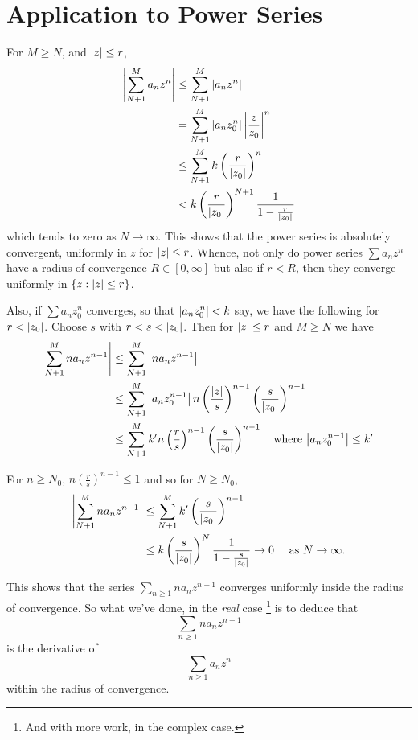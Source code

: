 \documentclass{notes}
\theoremstyle{plain}
\begin{document}
\section{Application to Power Series}
For $ M \geq N $, and $ \left|z\right| \leq r $,
\begin{align*}
\left|\sum_{N+1}^{M} a_n z^n \right| & \leq \sum_{N+1}^{M} \left|a_{n}z^{n}\right| \\
& = \sum_{N+1}^{M}\left|a_{n}z_{0}^{n}\right|\left|\frac{z}{z_{0}}\right|^{n} \\
& \leq \sum_{N+1}^{M} k \left( \frac{r}{\left|z_{0}\right|} \right)^{n} \\
& < k \left( \frac{r}{\left|z_{0}\right|}
\right)^{N+1}\frac{1}{1-\frac{r}{\left|z_{0}\right|}}
\end{align*}
which tends to zero as $  N \to \infty $.
This shows that the power series is absolutely convergent, uniformly 
in $ z $ for $ \left|z\right| \leq r $.
Whence, not only do power series
$\sum a_{n}z^{n}$ have a radius of convergence $R \in [0, 
\infty]$ but also if $ r < R $, then they converge uniformly in
$\{z : \left|z\right| \leq r \}$.

Also, if $\sum a_{n}z_{0}^{n}$ converges, so that  
$\left|a_{n}z_{0}^{n}\right| < k$ say, we have the following for $ r < 
\left|z_{0}\right| $.
Choose $ s $ with $ r<s<\left|z_{0}\right| $.
Then for $ \left|z\right| \leq r $ and $ M \geq N $ we have
\begin{align*}
\left| \sum_{N+1}^{M}n a_{n}z^{n-1}\right| & \leq \sum_{N+1}^{M}\left|n 
a_{n}z^{n-1}\right| \\
& \leq \sum_{N+1}^{M}\left|a_{n}z_{0}^{n-1}\right|n\left( 
\frac{\left|z\right|}{s} \right)^{n-1} \left(\frac{s}{\left|z_{0}\right|} 
\right)^{n-1} \\
& \leq \sum_{N+1}^{M}k'n \left( \frac{r}{s} \right)^{n-1} \left( 
\frac{s}{\left|z_{0}\right|} \right)^{n-1} \quad \text{where $ 
\left|a_{n}z_{0}^{n-1}\right| \leq k' $.}
\end{align*}

For $ n \geq N_{0} $, $n \left( \frac{r}{s} \right)^{n-1} \leq 1$ 
and so for $ N \geq N_{0} $, 
\begin{align*}
\left|\sum_{N+1}^{M}n a_{n}z^{n-1}\right| & \leq \sum_{N+1}^{M}k' \left( 
\frac{s}{\left|z_{0}\right|} \right)^{n-1} \\
& \leq k \left( \frac{s}{\left|z_{0}\right|} \right)^{N} 
\frac{1}{1-\frac{s}{\left|z_{0}\right|}} \to 0 \quad \text{ as } N \to \infty.
\end{align*}

This shows that the series $\sum_{n \geq 1}n a_{n}z^{n-1}$
converges uniformly inside the radius of convergence.
So what we've done, in the \emph{real} case%
\footnote{And with more work, in the complex case.}
is to deduce that \[ \sum_{n \geq 1}n a_{n}z^{n-1} \] is the 
derivative of \[ \sum_{n \geq 1}a_{n}z^{n} \] within the radius of 
convergence.
\end{document}
